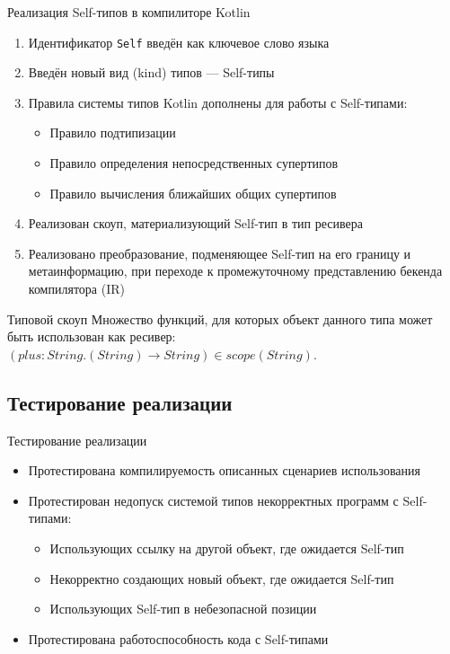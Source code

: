\documentclass[handout,aspectratio=169,usenames,dvipsnames]{beamer}
\begin{document}
    \begin{frame}{Реализация Self-типов в компилиторе Kotlin}

        \begin{enumerate}
            \item Идентификатор \texttt{Self} введён как ключевое слово языка
            \item Введён новый вид (kind) типов --- Self-типы
            \item Правила системы типов Kotlin дополнены для работы с Self-типами:
            \begin{itemize}
                \item Правило подтипизации
                \item Правило определения непосредственных супертипов
                \item Правило вычисления ближайших общих супертипов
            \end{itemize}
            \item Реализован скоуп, материализующий Self-тип в тип ресивера
            \item Реализовано преобразование, подменяющее Self-тип на его границу и метаинформацию, при переходе к промежуточному представлению бекенда компилятора (IR)
        \end{enumerate}

        \begin{block}{Типовой скоуп}
            Множество функций, для которых объект данного типа может быть использован как ресивер: $(plus : String.(String) \to String) \in scope(String)$.
        \end{block}
    \end{frame}


    \subsection{Тестирование реализации}

    \begin{frame}{Тестирование реализации}

        \begin{itemize}
            \item Протестирована компилируемость описанных сценариев использования
            \item Протестирован недопуск системой типов некорректных программ с Self-типами:
            \begin{itemize}
                \item Использующих ссылку на другой объект, где ожидается Self-тип
                \item Некорректно создающих новый объект, где ожидается Self-тип
                \item Использующих Self-тип в небезопасной позиции
            \end{itemize}
            \item Протестирована работоспособность кода с Self-типами
        \end{itemize}
    \end{frame}
\end{document}
